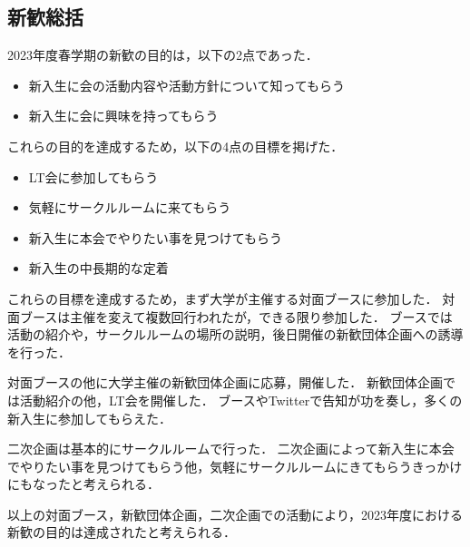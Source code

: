 \subsection*{新歓総括}


2023年度春学期の新歓の目的は，以下の2点であった．

\begin{itemize}
    \item 新入生に会の活動内容や活動方針について知ってもらう
    \item 新入生に会に興味を持ってもらう
\end{itemize}

これらの目的を達成するため，以下の4点の目標を掲げた．

\begin{itemize}
    \item LT会に参加してもらう
    \item 気軽にサークルルームに来てもらう
    \item 新入生に本会でやりたい事を見つけてもらう
    \item 新入生の中長期的な定着
\end{itemize}

これらの目標を達成するため，まず大学が主催する対面ブースに参加した．
対面ブースは主催を変えて複数回行われたが，できる限り参加した．
ブースでは活動の紹介や，サークルルームの場所の説明，後日開催の新歓団体企画への誘導を行った．

対面ブースの他に大学主催の新歓団体企画に応募，開催した．
新歓団体企画では活動紹介の他，LT会を開催した．
ブースやTwitterで告知が功を奏し，多くの新入生に参加してもらえた．

二次企画は基本的にサークルルームで行った．
二次企画によって新入生に本会でやりたい事を見つけてもらう他，気軽にサークルルームにきてもらうきっかけにもなったと考えられる．

以上の対面ブース，新歓団体企画，二次企画での活動により，2023年度における新歓の目的は達成されたと考えられる．
